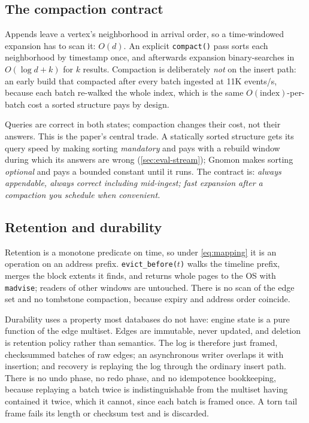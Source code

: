 \documentclass[letterpaper,twocolumn,10pt]{article}
\newcommand{\sys}{Gnomon\xspace}
\begin{document}
\subsection{The compaction contract}
Appends leave a vertex's neighborhood in arrival order, so a
time-windowed expansion has to scan it: $O(d)$. An explicit
\texttt{compact()} pass sorts each neighborhood by timestamp once, and
afterwards expansion binary-searches in $O(\log d + k)$ for $k$
results. Compaction is deliberately \emph{not} on the insert path: an early
build that compacted after every batch ingested at 11K events/s,
because each batch re-walked the whole index, which is the same
$O(\text{index})$-per-batch cost a sorted structure pays by design.

Queries are correct in both states; compaction changes their cost, not
their answers. This is the paper's central trade. A statically sorted
structure gets its query speed by making sorting \emph{mandatory} and
pays with a rebuild window during which its answers are wrong
(\cref{sec:eval-stream}); \sys makes sorting \emph{optional} and pays a
bounded constant until it runs. The contract is: \emph{always
appendable, always correct including mid-ingest; fast expansion after a
compaction you schedule when convenient.}

\subsection{Retention and durability}
Retention is a monotone predicate on time, so under \cref{eq:mapping}
it is an operation on an address prefix. \texttt{evict\_before($t$)}
walks the timeline prefix, merges the block extents it finds, and
returns whole pages to the OS with \texttt{madvise}; readers of other
windows are untouched. There is no scan of the edge set and no
tombstone compaction, because expiry and address order coincide.

\label{sec:design-durability}
Durability uses a property most databases do not have: engine state is
a pure function of the edge multiset. Edges are immutable, never
updated, and deletion is retention policy rather than semantics. The
log is therefore just framed, checksummed batches of raw edges; an
asynchronous writer overlaps it with insertion; and recovery is
replaying the log through the ordinary insert path. There is no undo
phase, no redo phase, and no idempotence bookkeeping, because
replaying a batch twice is indistinguishable from the multiset having
contained it twice, which it cannot, since each batch is framed once. A
torn tail frame fails its length or checksum test and is discarded.
\end{document}
